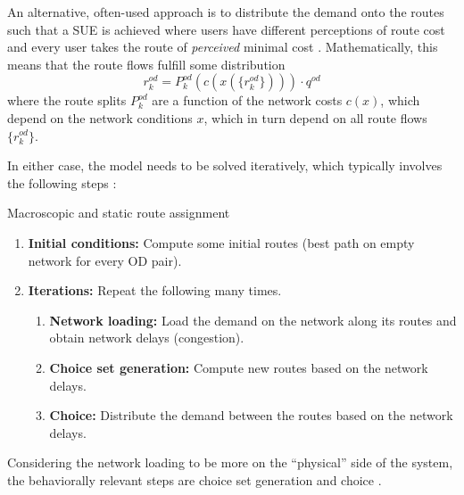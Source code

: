 An alternative, often-used approach is to distribute the demand onto
the routes such that a SUE is
achieved where users have different perceptions of route cost and
every user takes the route of \emph{perceived} minimal cost \citep{DaganzoSheffi_TransScience_1977}.
Mathematically, this means that the route flows fulfill some distribution
\begin{equation}
r^{od}_k = P^{od}_k(c(x(\{r^{od}_k\}))) \cdot q^{od}
\label{stoch-equil}
\end{equation}
where the route splits $P^{od}_k$ are a function of the network costs
$c(x)$, which depend on the network conditions $x$,
which in turn depend on all route flows $\{r^{od}_k\}$.

In either case, the model needs to be solved iteratively, 
which typically involves the following steps \citep{sheffi-1985}:

\begin{algorithm}[H]
\label{static-macro-routes}

\caption{Macroscopic and static route assignment}

\begin{enumerate}

\item \textbf{Initial conditions:} Compute some initial routes
  (\eg best path on empty network for every OD pair).

\item \textbf{Iterations:} Repeat the following many times.

\begin{enumerate}

\item \textbf{Network loading:} Load the demand on the network along
  its routes and obtain network delays (congestion).

\item \textbf{Choice set generation:} Compute new routes based on the
  network delays.

\item \textbf{Choice:} Distribute the demand between the routes based
  on the network delays.

\end{enumerate} %

\end{enumerate}

\end{algorithm}

Considering the network loading to be more on the ``physical'' side of the system, 
the behaviorally relevant steps are choice set generation and choice \citep{bowman-1998}.

